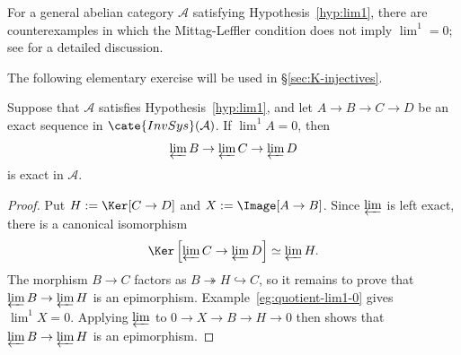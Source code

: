 For a general abelian category $\mathcal{A}$ satisfying
Hypothesis~\ref{hyp:lim1}, there are counterexamples in which the
Mittag-Leffler condition does not imply $\lim^1=0$; see \cite{Roo06} for a
detailed discussion.

The following elementary exercise will be used in \S\ref{sec:K-injectives}.

\begin{corollary}\label{prop:ML-4-terms}
	Suppose that $\mathcal{A}$ satisfies Hypothesis~\ref{hyp:lim1}, and let
	$A\to B\to C\to D$ be an exact sequence in
	$\cate{InvSys}(\mathcal{A})$. If $\lim^1A=0$, then
	\[ \varprojlim B \to \varprojlim C \to \varprojlim D \]
	is exact in $\mathcal{A}$.
\end{corollary}
\begin{proof}
	Put $H:=\Ker[C\to D]$ and $X:=\Image[A\to B]$. Since $\varprojlim$ is
	left exact, there is a canonical isomorphism
	\[ \Ker\left[ \varprojlim C \to \varprojlim D\right] \simeq \varprojlim H . \]
	The morphism $B\to C$ factors as $B\twoheadrightarrow H\hookrightarrow C$,
	so it remains to prove that $\varprojlim B\to\varprojlim H$ is an
	epimorphism. Example~\ref{eg:quotient-lim1-0} gives $\lim^1X=0$. Applying
	$\varprojlim$ to $0\to X\to B\to H\to0$ then shows that
	$\varprojlim B\to\varprojlim H$ is an epimorphism.
\end{proof}
